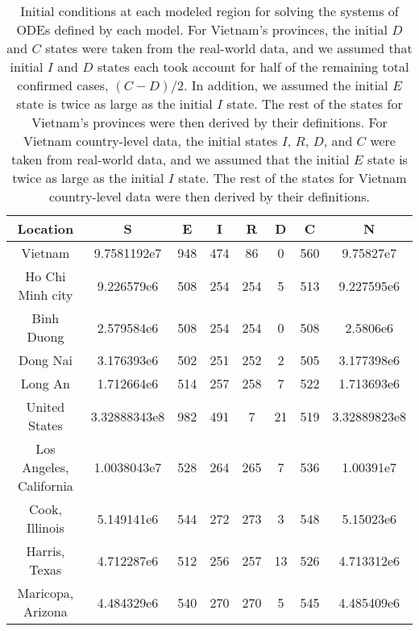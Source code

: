 \begin{table}[h]
    \centering
    \begin{tabular}{| c | c | c | c | c | c | c | c |}
        Location & S & E & I & R & D & C & N \\
        \hline\hline
        Vietnam & 9.7581192e7 & 948 & 474 & 86 & 0 & 560 & 9.75827e7 \\
        \hline
        Ho Chi Minh city & 9.226579e6 & 508 & 254 & 254 & 5 & 513 & 9.227595e6 \\
        \hline
        Binh Duong & 2.579584e6 & 508 & 254 & 254 & 0 & 508 & 2.5806e6 \\
        \hline
        Dong Nai & 3.176393e6 & 502 & 251 & 252 & 2 & 505 & 3.177398e6 \\
        \hline
        Long An & 1.712664e6 & 514 & 257 & 258 & 7 & 522 & 1.713693e6 \\
        \hline
        United States & 3.32888343e8 & 982 & 491 & 7 & 21 & 519 & 3.32889823e8 \\
        \hline
        Los Angeles, California & 1.0038043e7 & 528 & 264 & 265 & 7 & 536 & 1.00391e7 \\
        \hline
        Cook, Illinois & 5.149141e6 & 544 & 272 & 273 & 3 & 548 & 5.15023e6 \\
        \hline
        Harris, Texas & 4.712287e6 & 512 & 256 & 257 & 13 & 526 & 4.713312e6 \\
        \hline
        Maricopa, Arizona & 4.484329e6 & 540 & 270 & 270 & 5 & 545 & 4.485409e6 \\
        \hline
    \end{tabular}
    \caption{Initial conditions at each modeled region for solving the systems of \glspl{ODE} defined by each model. For Vietnam's provinces, the initial $D$ and $C$ states were taken from the real-world data, and we assumed that initial $I$ and $D$ states each took account for half of the remaining total confirmed cases, $(C - D) / 2$. In addition, we assumed the initial $E$ state is twice as large as the initial $I$ state. The rest of the states for Vietnam's provinces were then derived by their definitions. For Vietnam country-level data, the initial states $I$, $R$, $D$, and $C$ were taken from real-world data, and we assumed that the initial $E$ state is twice as large as the initial $I$ state. The rest of the states for Vietnam country-level data were then derived by their definitions.}
    \label{tab:ude-model-initial-conditions}
\end{table}

